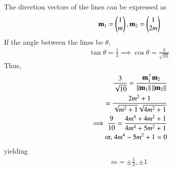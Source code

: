 The direction vectors of the lines can be expressed as
\begin{align}
\mathbf{m}_1=\begin{pmatrix}1\\m\end{pmatrix},
\mathbf{m}_2=\begin{pmatrix}1\\2m\end{pmatrix}
\end{align}
If the angle between the lines be $\theta$,
\begin{align}
\tan \theta = \frac{1}{3}
\implies \cos \theta=\frac{3}{\sqrt{10}}
\end{align}
Thus,
\begin{align}
	\frac{3}{\sqrt{10}} = \frac{\mathbf{m}_1^\top \mathbf{m}_2}{\left\lVert\mathbf{m}_1\right\rVert\left\lVert\mathbf{m}_2\right\rVert}
	\\
	= \frac{2m^2 +1}{\sqrt{m^2 + 1}\sqrt{4m^2 + 1}}
	\\
	\implies \frac{9}{10}=\frac{4m^4 + 4m^2 +1}{4m^4 + 5m^2 +1}
\\
	\text{or, } 4m^4 - 5m^2 +1 = 0
\end{align}
yielding
\begin{align}
m=\pm \frac{1}{2}, 
\pm 1
\end{align}
